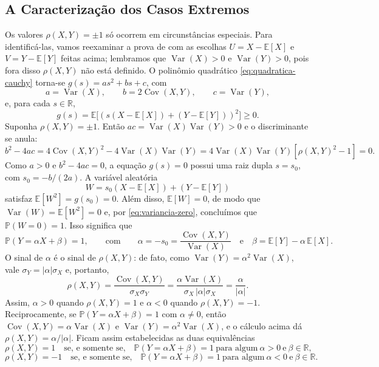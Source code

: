 \documentclass[12pt,portuguese]{article}
\theoremstyle{definition}
\theoremstyle{plainexercise}
\theoremstyle{starredexercise}
\theoremstyle{definition}
\begin{document}
\subsection{A Caracterização dos Casos Extremos}\label{subsec:correlacao-extremos}

Os valores $\rho(X,Y) = \pm 1$ só ocorrem em circunstâncias especiais. Para
identificá-las, vamos reexaminar a prova de  com as
escolhas $U = X - \mathbb{E}[X]$ e $V = Y - \mathbb{E}[Y]$ feitas acima;
lembramos que $\operatorname{Var}(X) > 0$ e $\operatorname{Var}(Y) > 0$, pois
fora disso $\rho(X,Y)$ não está definido. O polinômio quadrático
\eqref{eq:quadratica-cauchy} torna-se $g(s) = as^2 + bs + c$, com
\[
  a = \operatorname{Var}(X),
  \qquad b = 2\operatorname{Cov}(X,Y),
  \qquad c = \operatorname{Var}(Y),
\]
e, para cada $s\in\mathbb{R}$,
\[
  g(s)
  = \mathbb{E}\bigl[(s(X - \mathbb{E}[X]) + (Y - \mathbb{E}[Y]))^2\bigr]
  \geqslant 0.
\]
Suponha $\rho(X,Y) = \pm 1$. Então $ac = \operatorname{Var}(X)
\operatorname{Var}(Y) > 0$ e o discriminante se anula:
\[
  b^2 - 4ac
  = 4\operatorname{Cov}(X,Y)^2 - 4\operatorname{Var}(X)\operatorname{Var}(Y)
  = 4\operatorname{Var}(X)\operatorname{Var}(Y)[\rho(X,Y)^2 - 1]
  = 0.
\]
Como $a > 0$ e $b^2 - 4ac = 0$, a equação $g(s) = 0$ possui uma raiz dupla
$s = s_0$, com $s_0 = -b/(2a)$. A variável aleatória
\[
  W = s_0(X - \mathbb{E}[X]) + (Y - \mathbb{E}[Y])
\]
satisfaz $\mathbb{E}[W^2] = g(s_0) = 0$. Além disso, $\mathbb{E}[W] = 0$,
de modo que $\operatorname{Var}(W) = \mathbb{E}[W^2] = 0$ e, por
\eqref{eq:variancia-zero}, concluímos que $\mathbb{P}(W = 0) = 1$. Isso
significa que
\[
  \mathbb{P}(Y = \alpha X + \beta) = 1,
  \qquad\text{com}\qquad
  \alpha = -s_0 = \frac{\operatorname{Cov}(X,Y)}{\operatorname{Var}(X)}
  \quad\text{e}\quad
  \beta = \mathbb{E}[Y] - \alpha\,\mathbb{E}[X].
\]
O sinal de $\alpha$ é o sinal de $\rho(X,Y)$: de fato, como
$\operatorname{Var}(Y) = \alpha^2\operatorname{Var}(X)$, vale
$\sigma_Y = |\alpha|\sigma_X$ e, portanto,
\[
  \rho(X,Y)
  = \frac{\operatorname{Cov}(X,Y)}{\sigma_X\sigma_Y}
  = \frac{\alpha\operatorname{Var}(X)}{\sigma_X\,|\alpha|\sigma_X}
  = \frac{\alpha}{|\alpha|}.
\]
Assim, $\alpha > 0$ quando $\rho(X,Y) = 1$ e $\alpha < 0$ quando
$\rho(X,Y) = -1$. Reciprocamente, se $\mathbb{P}(Y = \alpha X + \beta) = 1$
com $\alpha \neq 0$, então $\operatorname{Cov}(X,Y) = \alpha
\operatorname{Var}(X)$ e $\operatorname{Var}(Y) = \alpha^2\operatorname{Var}(X)$,
e o cálculo acima dá $\rho(X,Y) = \alpha/|\alpha|$. Ficam assim
estabelecidas as duas equivalências
\begin{equation}\label{eq:correlacao-mais-um}
  \rho(X,Y) = 1
  \quad\text{se, e somente se,}\quad
  \mathbb{P}(Y = \alpha X + \beta) = 1
  \ \text{para algum}\ \alpha > 0\ \text{e}\ \beta\in\mathbb{R},
\end{equation}
\begin{equation}\label{eq:correlacao-menos-um}
  \rho(X,Y) = -1
  \quad\text{se, e somente se,}\quad
  \mathbb{P}(Y = \alpha X + \beta) = 1
  \ \text{para algum}\ \alpha < 0\ \text{e}\ \beta\in\mathbb{R}.
\end{equation}
\end{document}

